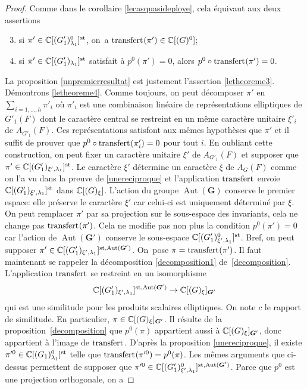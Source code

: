 \documentclass[JEP,XML,SOM,Unicode,francais]{cedram}
\newcommand{\NoChangel}[1]{%
\expandafter\let\csname old\string#1\endcsname=#1
\let#1=\relax
\newcommand{#1}{\mathcode`l="716C\csname old\string#1\endcsname\mathcode`l="7160 }%
}
\newcommand{\rell}{\mathrm{ell}} \NoChangel{\rell}
\newcommand{\Ell}{\mathrm{Ell}} \NoChangel{\Ell}
\newcommand{\st}{\mathrm{st}}
\DeclareMathOperator{\Aut}{Aut}
\DeclareMathOperator{\transfert}{transfert}
\newcommand{\bG}{\boldsymbol{G}}
\newcommand{\CC}{\mathbb{C}}
\theoremstyle{plain}
\theoremstyle{definition}
\begin{document}
\begin{proof}
Comme dans le corollaire \ref{lecasquasideploye}, cela équivaut aux deux assertions
\begin{enumerate}\setcounter{enumi}{2}
\item\label{letheoreme3}
si $\pi'\in \CC[\Ell(G'_{1})_{\lambda_{1}}^0]^{\st}$, on~a $\transfert_{\rell}(\pi')\in \CC[\Ell(G)^0]$;

\item\label{letheoreme4}
si $\pi'\in \CC[\Ell(G'_{1})_{\lambda_{1}}]^{\st}$ satisfait à $p^0(\pi')=0$, alors $p^0\circ \transfert_{\rell}(\pi')=0$.
\end{enumerate}

La proposition \ref{unpremierresultat} est justement l'assertion \eqref{letheoreme3}. Démontrons \eqref{letheoreme4}. Comme toujours, on peut décomposer $\pi'$ en $\sum_{i=1,\dots,h}\pi'_{i}$ où $\pi'_{i}$ est une combinaison linéaire de représentations elliptiques de $G'_{1}(F)$ dont le caractère central se restreint en un même caractère unitaire $\xi'_{i}$ de $A_{G'_{1}}(F)$. Ces représentations satisfont aux mêmes hypothèses que $\pi'$ et il suffit de prouver que $p^0\circ \transfert_{\rell}(\pi'_{i})=0$ pour tout $i$. En oubliant cette construction, on peut fixer un caractère unitaire $\xi'$ de $A_{G'_{1}}(F)$ et supposer que $\pi'\in \CC[\Ell(G'_{1})_{\xi',\lambda_{1}}]^{\st}$. Le caractère $\xi'$ détermine un caractère $\xi$ de $A_{G}(F)$ comme on l'a vu dans la preuve de \ref{unereciproque} et l'application $\transfert_{\rell}$ envoie $\CC[\Ell(G'_{1})_{\xi',\lambda_{1}}]^{\st}$ dans $\CC[\Ell(G)_{\xi}]$. L'action du groupe $\Aut(\bG)$ conserve le premier espace: elle préserve le caractère $\xi'$ car celui-ci est uniquement déterminé par $\xi$. On peut remplacer $\pi'$ par sa projection sur le sous-espace des invariants, cela ne change pas $\transfert_{\rell}(\pi')$. Cela ne modifie pas non plus la condition $p^0(\pi')=0$ car l'action de $\Aut(\bG')$ conserve le sous-espace $\CC[\Ell(G'_{1})^0_{\xi',\lambda_{1}}]^{\st}$. Bref, on peut supposer $\pi'\in \CC[\Ell(G'_{1})_{\xi',\lambda_{1}}]^{\st,\Aut(\bG')}$. On~pose $\pi=\transfert_{\rell}(\pi')$. Il faut maintenant se rappeler la décomposition \eqref{decomposition1} de~\ref{decomposition}. L'application $\transfert_{\rell}$ se restreint en un isomorphisme
\[
\CC[\Ell(G'_{1})_{\xi',\lambda_{1}}]^{\st,\Aut(\bG')}\to \CC[\Ell(G)_{\xi}]_{\bG'}
\]
qui est une similitude pour les produits scalaires elliptiques. On note $c$ le rapport de similitude. En particulier, $\pi\in \CC[\Ell(G)_{\xi}]_{\bG'}$. Il résulte de la proposition~\ref{decomposition} que $p^0(\pi)$ appartient aussi à $\CC[\Ell(G)_{\xi}]_{\bG'}$, donc appartient à l'image de $\transfert_{\rell}$. D'après la proposition \ref{unereciproque}, il existe $\pi^{\prime0}\in \CC[\Ell(G_{1})^0_{\lambda_{1}}]^{\st}$ telle que $\transfert_{\rell}(\pi^{\prime0})=p^0(\pi)$. Les mêmes arguments que ci-dessus permettent de supposer que $\pi^{\prime0}\in \CC[\Ell(G'_{1})^0_{\xi',\lambda_{1}}]^{\st,\Aut(\bG')}$. Parce que $p^0$ est une projection orthogonale, on a

\end{proof}
\end{document}
